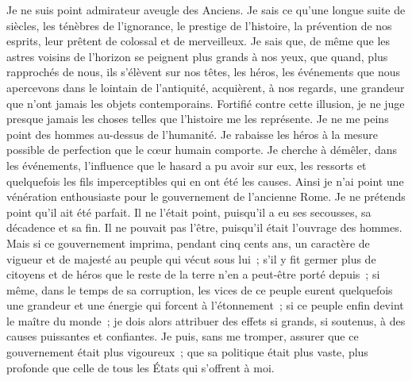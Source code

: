 \documentclass[french,twoside]{book} %
\begin{document}
Je ne suis point admirateur aveugle des Anciens. Je sais ce qu’une longue suite de siècles, les ténèbres de l’ignorance, le prestige de l’histoire, la prévention de nos esprits, leur prêtent de colossal et de merveilleux. Je sais que, de même que les astres voisins de l’horizon se peignent plus grands à nos yeux, que quand, plus rapprochés de nous, ils s’élèvent sur nos têtes, les héros, les événements que nous apercevons dans le lointain de l’antiquité, acquièrent, à nos regards, une grandeur que n’ont jamais les objets contemporains. Fortifié contre cette illusion, je ne juge presque jamais les choses telles que l’histoire me les représente. Je ne me peins point des hommes au-dessus de l’humanité. Je rabaisse les héros à la mesure possible de perfection que le cœur humain comporte. Je cherche à démêler, dans les événements, l’influence que le hasard a pu avoir sur eux, les ressorts et quelquefois les fils imperceptibles qui en ont été les causes. Ainsi je n’ai point une vénération enthousiaste pour le gouvernement de l’ancienne Rome. Je ne prétends point qu’il ait été parfait. Il ne l’était point, puisqu’il a eu ses secousses, sa décadence et sa fin. Il ne pouvait pas l’être, puisqu’il était l’ouvrage des hommes. Mais si ce gouvernement imprima, pendant cinq cents ans, un caractère de vigueur et de majesté au peuple qui vécut sous lui ; s’il y fit germer plus de citoyens et de héros que le reste de la terre n’en a peut-être porté depuis ; si même, dans le temps de sa corruption, les vices de ce peuple eurent quelquefois une grandeur et une énergie qui forcent à l’étonnement ; si ce peuple enfin devint le maître du monde ; je dois alors attribuer des effets si grands, si soutenus, à des causes puissantes et confiantes. Je puis, sans me tromper, assurer que ce gouvernement était plus vigoureux ; que sa politique était plus vaste, plus profonde que celle de tous les États qui s’offrent à moi.\par
\end{document}

